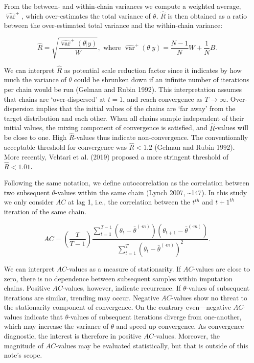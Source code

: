 \documentclass[
  Royal, times, sageapa]{sagej}
\begin{document}
From the between- and within-chain variances we compute a weighted
average, \(\widehat{\operatorname{var}}^{+}\), which over-estimates the
total variance of \(\theta\). \(\widehat{R}\) is then obtained as a
ratio between the over-estimated total variance and the within-chain
variance:

\begin{equation*}
\widehat{R}=\sqrt{\frac{\widehat{\operatorname{var}}^{+}(\theta | y)}{W}},
\text{ where } \widehat{\operatorname{var}}^{+}(\theta | y)=\frac{N-1}{N} W+\frac{1}{N} B.
\end{equation*}

We can interpret \(\widehat{R}\) as potential scale reduction factor
since it indicates by how much the variance of \(\theta\) could be
shrunken down if an infinite number of iterations per chain would be run
(Gelman and Rubin 1992). This interpretation assumes that chains are
`over-dispersed' at \(t=1\), and reach convergence as \(T \to \infty\).
Over-dispersion implies that the initial values of the chains are `far
away' from the target distribution and each other. When all chains
sample independent of their initial values, the mixing component of
convergence is satisfied, and \(\widehat{R}\)-values will be close to
one. High \(\widehat{R}\)-values thus indicate non-convergence. The
conventionally acceptable threshold for convergence was
\(\widehat{R} < 1.2\) (Gelman and Rubin 1992). More recently, Vehtari et
al. (2019) proposed a more stringent threshold of
\(\widehat{R} < 1.01\).

Following the same notation, we define autocorrelation as the
correlation between two subsequent \(\theta\)-values within the same
chain (Lynch 2007, \textasciitilde147). In this study we only consider
\(AC\) at lag 1, i.e., the correlation between the \(t^{th}\) and
\(t+1^{th}\) iteration of the same chain.

\begin{equation*}
AC = \left( \frac{T}{T-1} \right) \frac{\sum_{t=1}^{T-1}(\theta_t - \bar{\theta}^{(\cdot m)})(\theta_{t+1} - \bar{\theta}^{(\cdot m)})}{\sum_{t=1}^{T}(\theta_t - \bar{\theta}^{(\cdot m)})^2}.
\end{equation*}

We can interpret \(AC\)-values as a measure of stationarity. If
\(AC\)-values are close to zero, there is no dependence between
subsequent samples within imputation chains. Positive \(AC\)-values,
however, indicate recurrence. If \(\theta\)-values of subsequent
iterations are similar, trending may occur. Negative \(AC\)-values show
no threat to the stationarity component of convergence. On the contrary
even---negative \(AC\)-values indicate that \(\theta\)-values of
subsequent iterations diverge from one-another, which may increase the
variance of \(\theta\) and speed up convergence. As convergence
diagnostic, the interest is therefore in positive \(AC\)-values.
Moreover, the magnitude of \(AC\)-values may be evaluated statistically,
but that is outside of this note's scope.
\end{document}
